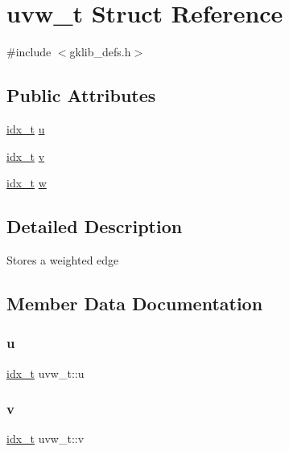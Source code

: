 \hypertarget{a00710}{}\section{uvw\+\_\+t Struct Reference}
\label{a00710}


{\ttfamily \#include $<$gklib\+\_\+defs.\+h$>$}

\subsection*{Public Attributes}
\begin{DoxyCompactItemize}
\item 
\hyperlink{a00876_aaa5262be3e700770163401acb0150f52}{idx\+\_\+t} \hyperlink{a00710_a5acfd17a9a2237ffd08a084887fc2f49}{u}
\item 
\hyperlink{a00876_aaa5262be3e700770163401acb0150f52}{idx\+\_\+t} \hyperlink{a00710_a9acbeec0726e1cf3842a174e44031bcc}{v}
\item 
\hyperlink{a00876_aaa5262be3e700770163401acb0150f52}{idx\+\_\+t} \hyperlink{a00710_ad8b9f1185850e05876ee066a461c0d9d}{w}
\end{DoxyCompactItemize}


\subsection{Detailed Description}
Stores a weighted edge 

\subsection{Member Data Documentation}
\mbox{\label{a00710_a5acfd17a9a2237ffd08a084887fc2f49}} 
\subsubsection{\texorpdfstring{u}{u}}
{\footnotesize\ttfamily \hyperlink{a00876_aaa5262be3e700770163401acb0150f52}{idx\+\_\+t} uvw\+\_\+t\+::u}

\mbox{\label{a00710_a9acbeec0726e1cf3842a174e44031bcc}} 
\subsubsection{\texorpdfstring{v}{v}}
{\footnotesize\ttfamily \hyperlink{a00876_aaa5262be3e700770163401acb0150f52}{idx\+\_\+t} uvw\+\_\+t\+::v}

